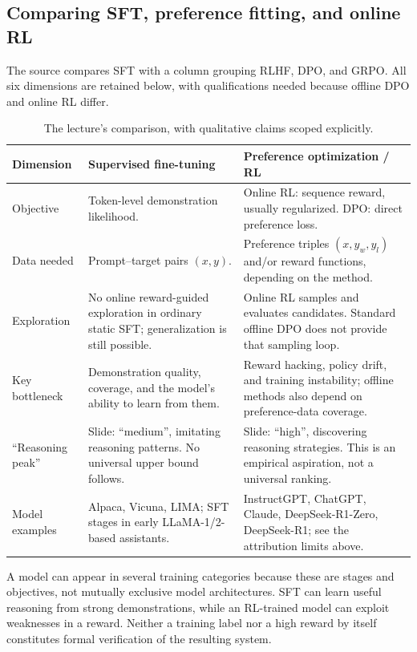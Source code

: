\documentclass[11pt,a4paper]{article}
\numberwithin{equation}{section}
\numberwithin{figure}{section}
\numberwithin{table}{section}
\begin{document}
\subsection{Comparing SFT, preference fitting, and online RL}\label{sec:llmcomparison}
The source compares SFT with a column grouping RLHF, DPO, and GRPO. All six dimensions are retained below, with qualifications needed because offline DPO and online RL differ.
\begin{table}[htbp]\centering\small
\caption{The lecture's comparison, with qualitative claims scoped explicitly.}
\begin{tabularx}{\textwidth}{@{}P{24mm}YY@{}}\toprule
Dimension & Supervised fine-tuning & Preference optimization / RL\\\midrule
Objective & Token-level demonstration likelihood. & Online RL: sequence reward, usually regularized. DPO: direct preference loss.\\\addlinespace
Data needed & Prompt--target pairs $(x,y)$. & Preference triples $(x,y_w,y_l)$ and/or reward functions, depending on the method.\\\addlinespace
Exploration & No online reward-guided exploration in ordinary static SFT; generalization is still possible. & Online RL samples and evaluates candidates. Standard offline DPO does not provide that sampling loop.\\\addlinespace
Key bottleneck & Demonstration quality, coverage, and the model's ability to learn from them. & Reward hacking, policy drift, and training instability; offline methods also depend on preference-data coverage.\\\addlinespace
``Reasoning peak'' & Slide: ``medium'', imitating reasoning patterns. No universal upper bound follows. & Slide: ``high'', discovering reasoning strategies. This is an empirical aspiration, not a universal ranking.\\\addlinespace
Model examples & Alpaca, Vicuna, LIMA; SFT stages in early LLaMA-1/2-based assistants. & InstructGPT, ChatGPT, Claude, DeepSeek-R1-Zero, DeepSeek-R1; see the attribution limits above.\\\bottomrule
\end{tabularx}\end{table}\FloatBarrier
A model can appear in several training categories because these are stages and objectives, not mutually exclusive model architectures. SFT can learn useful reasoning from strong demonstrations, while an RL-trained model can exploit weaknesses in a reward. Neither a training label nor a high reward by itself constitutes formal verification of the resulting system.
\end{document}
